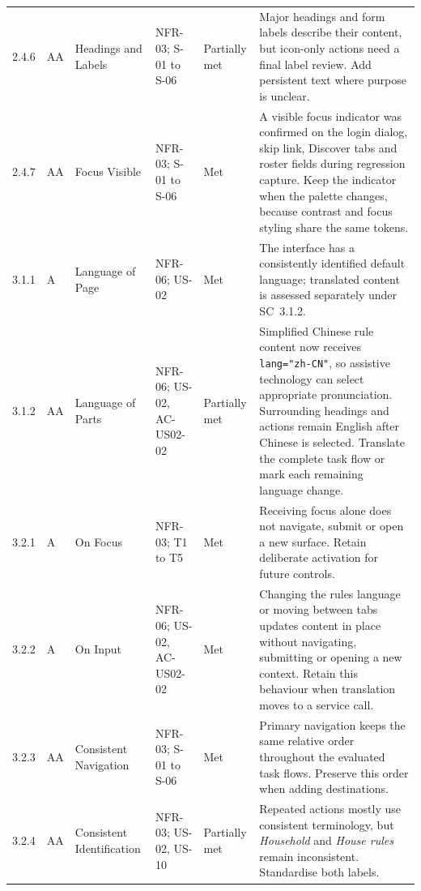 \documentclass[11pt,a4paper]{article}
\begin{document}
{\begin{longtable}{@{}L{1.1cm}L{0.85cm}L{2.25cm}L{2.35cm}L{1.3cm}L{5.05cm}@{}}
    2.4.6 &
    AA &
    Headings and Labels &
    NFR-03; S-01 to S-06 &
    Partially met &
    Major headings and form labels describe their content, but icon-only
    actions need a final label review. Add persistent text where purpose is
    unclear.\\

    2.4.7 &
    AA &
    Focus Visible &
    NFR-03; S-01 to S-06 &
    Met &
    A visible focus indicator was confirmed on the login dialog, skip link,
    Discover tabs and roster fields during regression capture. Keep the
    indicator when the palette changes, because contrast and focus styling
    share the same tokens.\\

    3.1.1 &
    A &
    Language of Page &
    NFR-06; US-02 &
    Met &
    The interface has a consistently identified default language; translated
    content is assessed separately under SC~3.1.2.\\

    3.1.2 &
    AA &
    Language of Parts &
    NFR-06; US-02, AC-US02-02 &
    Partially met &
    Simplified Chinese rule content now receives \texttt{lang="zh-CN"}, so
    assistive technology can select appropriate pronunciation. Surrounding
    headings and actions remain English after Chinese is selected. Translate
    the complete task flow or mark each remaining language change.\\

    3.2.1 &
    A &
    On Focus &
    NFR-03; T1 to T5 &
    Met &
    Receiving focus alone does not navigate, submit or open a new surface.
    Retain deliberate activation for future controls.\\

    3.2.2 &
    A &
    On Input &
    NFR-06; US-02, AC-US02-02 &
    Met &
    Changing the rules language or moving between tabs updates content in
    place without navigating, submitting or opening a new context. Retain this
    behaviour when translation moves to a service call.\\

    3.2.3 &
    AA &
    Consistent Navigation &
    NFR-03; S-01 to S-06 &
    Met &
    Primary navigation keeps the same relative order throughout the evaluated
    task flows. Preserve this order when adding destinations.\\

    3.2.4 &
    AA &
    Consistent Identification &
    NFR-03; US-02, US-10 &
    Partially met &
    Repeated actions mostly use consistent terminology, but \textit{Household}
    and \textit{House rules} remain inconsistent. Standardise both labels.\\


\end{longtable}}
\end{document}
